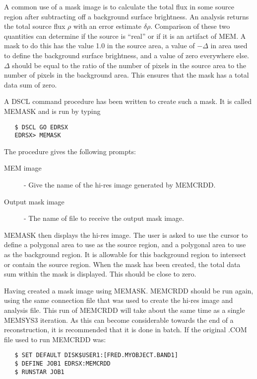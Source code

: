 A common use of a mask image is to calculate the total flux in some source 
region after subtracting off a background surface brightness. An analysis 
returns the total source flux $\rho$ with an error estimate $\delta\rho$. 
Comparison of these two quantities can determine if the source is ``real'' or
if  it is an artifact of MEM. A mask to do this has the value 1.0 in the source 
area, a value of $-\Delta$ in area used to define the background surface 
brightness, and a value of zero everywhere else. $\Delta$ should be equal to
the  ratio of the number of pixels in the source area to the number of pixels
in the  background area. This ensures that the mask has a total data sum of
zero.

A DSCL command procedure has been written to create such a mask. It is called 
MEMASK and is run by typing

\begin{verbatim}
   $ DSCL GO EDRSX
   EDRSX> MEMASK
\end{verbatim}

The procedure gives the following prompts:

\begin {description}
\item [MEM image] - Give the name of the hi-res image generated by MEMCRDD.
\item [Output mask image] - The name of file to receive the output mask image.
\end {description}

MEMASK then displays the hi-res image. The user is asked to use the cursor to
define a polygonal area to use as the source region, and a polygonal area to use
as the background region. It is allowable for this background region to
intersect or contain the source region. When the mask has been created, the
total data sum within the mask is displayed. This should be close to zero. 

Having created a mask image using MEMASK. MEMCRDD should be run again, using 
the same connection file that was used to create the hi-res image and analysis 
file. This run of MEMCRDD will take about the same time as a single MEMSYS3 
iteration. As this can become considerable towards the end of a reconstruction, 
it is recommended that it is done in batch. If the original .COM file used to 
run MEMCRDD was:

\begin{verbatim}
   $ SET DEFAULT DISK$USER1:[FRED.MYOBJECT.BAND1]
   $ DEFINE JOB1 EDRSX:MEMCRDD
   $ RUNSTAR JOB1
\end{verbatim}

